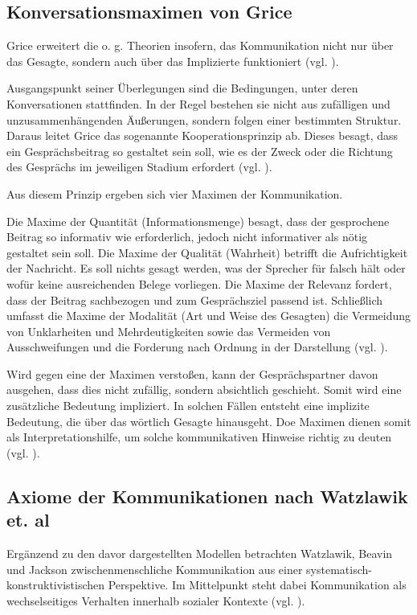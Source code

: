 \subsection{Konversationsmaximen von Grice}
Grice erweitert die o. g. Theorien insofern, das Kommunikation nicht nur über das Gesagte, sondern auch über das Implizierte funktioniert (vgl. \citealp[S. 43f]{grice1975logic}). 

Ausgangspunkt seiner Überlegungen sind die Bedingungen, unter deren Konversationen stattfinden. In der Regel bestehen sie nicht aus zufälligen und unzusammenhängenden Äußerungen, sondern folgen einer bestimmten Struktur. Daraus leitet Grice das sogenannte Kooperationsprinzip ab. Dieses besagt, dass ein Gesprächsbeitrag so gestaltet sein soll, wie es der Zweck oder die Richtung des Gesprächs im jeweiligen Stadium erfordert (vgl. \citealp[S. 45]{grice1975logic}).

Aus diesem Prinzip ergeben sich vier Maximen der Kommunikation. 

Die Maxime der Quantität (Informationsmenge) besagt, dass der gesprochene Beitrag so informativ wie erforderlich, jedoch nicht informativer als nötig gestaltet sein soll. Die Maxime der Qualität (Wahrheit) betrifft die Aufrichtigkeit der Nachricht. Es soll nichts gesagt werden, was der Sprecher für falsch hält oder wofür keine ausreichenden Belege vorliegen. Die Maxime der Relevanz fordert, dass der Beitrag sachbezogen und zum Gesprächsziel passend ist. Schließlich umfasst die Maxime der Modalität (Art und Weise des Gesagten) die Vermeidung von Unklarheiten und Mehrdeutigkeiten sowie das Vermeiden von Ausschweifungen und die Forderung nach Ordnung in der Darstellung (vgl. \citealp[S. 45f]{grice1975logic}).

Wird gegen eine der Maximen verstoßen, kann der Gesprächspartner davon ausgehen, dass dies nicht zufällig, sondern absichtlich geschieht. Somit wird eine zusätzliche Bedeutung impliziert. In solchen Fällen entsteht eine implizite Bedeutung, die über das wörtlich Gesagte hinausgeht. Doe Maximen dienen somit als Interpretationshilfe, um solche kommunikativen Hinweise richtig zu deuten (vgl. \citealp[S. 49f]{grice1975logic}).

\subsection{Axiome der Kommunikationen nach Watzlawik et. al}
Ergänzend zu den davor dargestellten Modellen betrachten Watzlawik, Beavin und Jackson zwischenmenschliche Kommunikation aus einer systematisch-konstruktivistischen Perspektive. Im Mittelpunkt steht dabei Kommunikation als wechselseitiges Verhalten innerhalb sozialer Kontexte (vgl. \citealp{Watzlawick2016-km}). 

